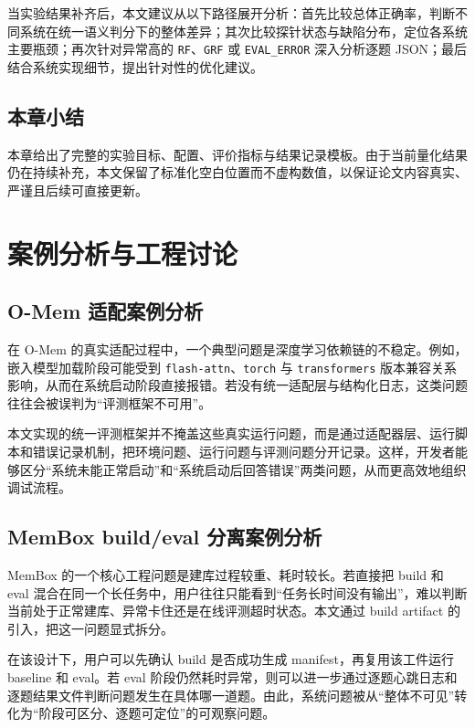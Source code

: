 当实验结果补齐后，本文建议从以下路径展开分析：首先比较总体正确率，判断不同系统在统一语义判分下的整体差异；其次比较探针状态与缺陷分布，定位各系统主要瓶颈；再次针对异常高的 \texttt{RF}、\texttt{GRF} 或 \texttt{EVAL\_ERROR} 深入分析逐题 JSON；最后结合系统实现细节，提出针对性的优化建议。

\section{本章小结}

本章给出了完整的实验目标、配置、评价指标与结果记录模板。由于当前量化结果仍在持续补充，本文保留了标准化空白位置而不虚构数值，以保证论文内容真实、严谨且后续可直接更新。

\chapter{案例分析与工程讨论}

\section{O-Mem 适配案例分析}

在 O-Mem 的真实适配过程中，一个典型问题是深度学习依赖链的不稳定。例如，嵌入模型加载阶段可能受到 \texttt{flash-attn}、\texttt{torch} 与 \texttt{transformers} 版本兼容关系影响，从而在系统启动阶段直接报错。若没有统一适配层与结构化日志，这类问题往往会被误判为“评测框架不可用”。

本文实现的统一评测框架并不掩盖这些真实运行问题，而是通过适配器层、运行脚本和错误记录机制，把环境问题、运行问题与评测问题分开记录。这样，开发者能够区分“系统未能正常启动”和“系统启动后回答错误”两类问题，从而更高效地组织调试流程。

\section{MemBox build/eval 分离案例分析}

MemBox 的一个核心工程问题是建库过程较重、耗时较长。若直接把 build 和 eval 混合在同一个长任务中，用户往往只能看到“任务长时间没有输出”，难以判断当前处于正常建库、异常卡住还是在线评测超时状态。本文通过 build artifact 的引入，把这一问题显式拆分。

在该设计下，用户可以先确认 build 是否成功生成 manifest，再复用该工件运行 baseline 和 eval。若 eval 阶段仍然耗时异常，则可以进一步通过逐题心跳日志和逐题结果文件判断问题发生在具体哪一道题。由此，系统问题被从“整体不可见”转化为“阶段可区分、逐题可定位”的可观察问题。

